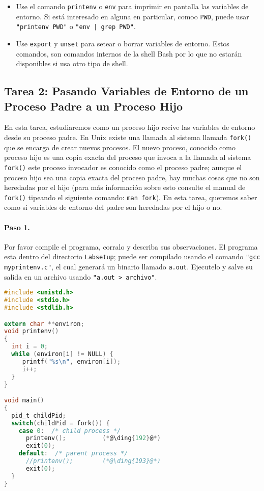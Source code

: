 \begin{itemize}
\item  Use el comando {\tt printenv} o {\tt env} para imprimir en pantalla las variables de entorno. Si está interesado en alguna en particular, comoo {\tt PWD}, puede usar  {\tt "printenv PWD"} o  {\tt "env | grep PWD"}.

\item Use {\tt export} y {\tt unset} para setear o borrar variables de entorno. Estos comandos, son comandos internos de la shell Bash por lo que no estarán disponibles si usa otro tipo de shell.
\end{itemize}


\subsection{Tarea 2: Pasando Variables de Entorno de un Proceso Padre a un Proceso Hijo}

En esta tarea, estudiaremos como un proceso hijo recive las variables de entorno desde su proceso padre. En Unix existe una llamada al sistema llamada {\tt fork()} que se encarga de crear nuevos procesos. El nuevo proceso, conocido como proceso hijo es una copia exacta del proceso que invoca a la llamada al sistema  {\tt fork()} este proceso invocador es conocido como el proceso padre; aunque el proceso hijo sea una copia exacta del proceso padre, hay muchas cosas que no son heredadas por el hijo (para más información sobre esto consulte el manual de  {\tt fork()} tipeando el siguiente comando: {\tt man fork}). En esta tarea, queremos saber como si variables de entorno del padre son heredadas por el hijo o no.


\paragraph{Paso 1.} Por favor compile el programa, corralo y describa sus observaciones. El programa esta dentro del directorio  \texttt{Labsetup}; puede ser compilado usando el comando \texttt{"gcc myprintenv.c"}, el cual generará un binario llamado \texttt{a.out}. Ejecutelo y salve su salida en un archivo usando 
\texttt{"a.out > archivo"}.

\begin{lstlisting}[language=C, caption={\texttt{myprintenv.c}}]
#include <unistd.h>
#include <stdio.h>
#include <stdlib.h>

extern char **environ;
void printenv()
{
  int i = 0;
  while (environ[i] != NULL) {
     printf("%s\n", environ[i]);
     i++;
  }
}

void main()
{
  pid_t childPid;
  switch(childPid = fork()) {
    case 0:  /* child process */
      printenv();          (*@\ding{192}@*)
      exit(0);
    default:  /* parent process */
      //printenv();        (*@\ding{193}@*)
      exit(0);
  }
}
\end{lstlisting}

